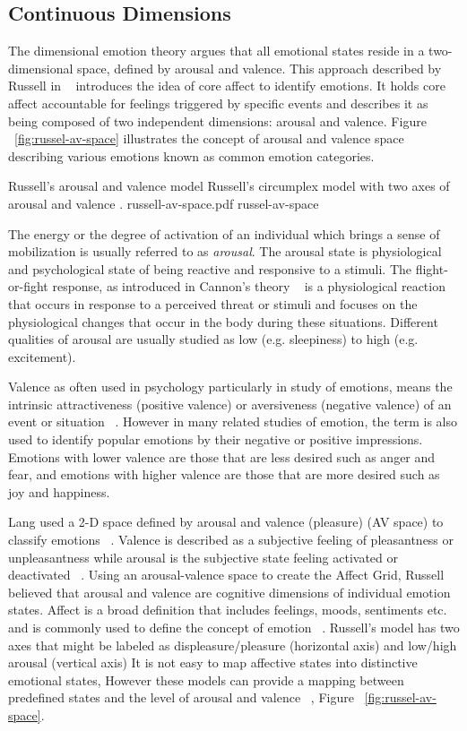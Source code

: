 \subsection{Continuous Dimensions}

The dimensional emotion theory argues that all emotional states reside in a two-dimensional space, defined by arousal and valence. This approach described by Russell in ~\cite{russell2003core} introduces the idea of core affect to identify emotions. It holds core affect accountable for feelings triggered by specific events and describes it as being composed of two independent dimensions: arousal and valence. Figure ~\ref{fig:russel-av-space} illustrates the concept of arousal and valence space describing various emotions known as common emotion categories.

\img
{Russell's arousal and valence model}
{Russell's circumplex model with two axes of arousal and valence \footnotemark.}
{russell-av-space.pdf}
{russel-av-space}

The energy or the degree of activation of an individual which brings a sense of mobilization is usually referred to as \textit{arousal}. The arousal state is physiological and psychological state of being reactive and responsive to a stimuli. The flight-or-fight response, as introduced in Cannon's theory ~\cite{stern2001psychophysiological} is a physiological reaction that occurs in response to a perceived threat or stimuli and focuses on the physiological changes that occur in the body during these situations. Different qualities of arousal are usually studied as low (e.g. sleepiness) to high (e.g. excitement).

Valence as often used in psychology particularly in study of emotions, means the intrinsic attractiveness (positive valence) or aversiveness (negative valence) of an event or situation ~\cite{frijda1986emotions}. However in many related studies of emotion, the term is also used to identify popular emotions by their negative or positive impressions. Emotions with lower valence are those that are less desired such as anger and fear, and emotions with higher valence are those that are more desired such as joy and happiness.

Lang used a 2-D space defined by arousal and valence (pleasure) (AV space) to classify emotions ~\cite{lang1995emotion}. Valence is described as a subjective feeling of pleasantness or unpleasantness while arousal is the subjective state feeling activated or deactivated ~\cite{barrett1998discrete}. Using an arousal-valence space to create the Affect Grid, Russell believed that arousal and valence are cognitive dimensions of individual emotion states. Affect is a broad definition that includes feelings, moods, sentiments etc. and is commonly used to define the concept of emotion ~\cite{picard2003affective}. Russell's model has two axes that might be labeled as displeasure/pleasure (horizontal axis) and low/high arousal (vertical axis) It is not easy to map affective states into distinctive emotional states, However these models can provide a mapping between predefined states and the level of arousal and valence ~\cite{zagalo2004story}, Figure ~\ref{fig:russel-av-space}.

